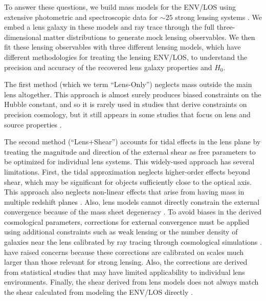 \documentclass{emulateapj}
\begin{document}
To answer these questions, we build mass models for the ENV/LOS using extensive photometric and spectroscopic data for $\sim25$ strong lensing systems \citep{Momcheva06,Williams06,Momcheva15}. We embed a lens galaxy in these models and ray trace through the full three-dimensional matter distributions to generate mock lensing observables. We then fit these lensing observables with three different lensing models, which have different methodologies for treating the lensing ENV/LOS,
to understand the precision and accuracy of the recovered lens galaxy properties and $H_0$.

The first method (which we term ``Lens-Only'') neglects mass outside the main lens altogether.  This approach is almost surely produces biased constraints on the Hubble constant, and so it is rarely used in studies that derive constraints on precision cosmology, but it still appears in some studies that focus on lens and source properties \citep[e.g.][]{Calanog14, Hezaveh13}.

The second method (``Lens+Shear'') accounts for tidal effects in the lens plane by treating the magnitude and direction of the external shear as free parameters to be optimized for individual lens systems. This widely-used approach has several limitations. First, the tidal approximation neglects higher-order effects beyond shear, which may be significant for objects sufficiently close to the optical axis. This approach also neglects non-linear effects that arise from having mass in multiple redshift planes \citep[][]{McCully14,Jaroszynski12}. Also, lens models cannot directly constrain the external convergence because of the mass sheet degeneracy \citep{Falco85}.  To avoid biases in the derived cosmological parameters, corrections for external convergence must be applied using additional constraints such as weak lensing \citep{Nakajima09, Fadely10} or the number density of galaxies near the lens \citep[][Rusu et al.\ in preparation]{Suyu10, Suyu13, Collett13, Greene13} calibrated by ray tracing through cosmological simulations \citep[e.g.,][]{Hilbert09}. \citet{Schneider13} have raised concerns because these corrections are calibrated on scales much larger than those relevant for strong lensing.  Also, the corrections are derived from statistical studies that may have limited applicability to individual lens environments. Finally, the shear derived from lens models does not always match the shear calculated from modeling the ENV/LOS directly \citep{Wong11}.
\end{document}
